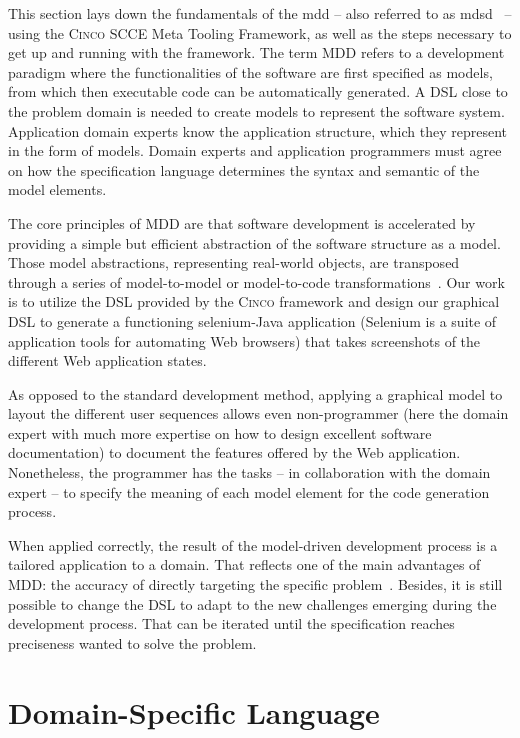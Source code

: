 This section lays down the fundamentals of the \gls{mdd} -- also referred to as \gls{mdsd}~\cite{fowler} --  using the \textsc{Cinco} SCCE Meta Tooling Framework, as well as the steps necessary to get up and running with the framework. The term MDD refers to a development paradigm where the functionalities of the software are first specified as models, from which then executable code can be automatically generated. A DSL close to the problem domain is needed to create models to represent the software system. Application domain experts know the application structure, which they represent in the form of models. Domain experts and application programmers must agree on how the specification language determines the syntax and semantic of the model elements.

The core principles of MDD are that software development is accelerated by providing a simple but efficient abstraction of the software structure as a model. Those model abstractions, representing real-world objects, are transposed through a series of model-to-model or model-to-code transformations~\cite{stahl_et_al}. Our work is to utilize the DSL provided by the \textsc{Cinco} framework and design our graphical DSL to generate a functioning \gls*{selenium}-Java application (Selenium is a suite of application tools for automating Web browsers) that takes screenshots of the different Web application states.

As opposed to the standard development method, applying a graphical model to layout the different user sequences allows even non-programmer (here the domain expert with much more expertise on how to design excellent software documentation) to document the features offered by the Web application. Nonetheless, the programmer has the tasks -- in collaboration with the domain expert -- to specify the meaning of each model element for the code generation process. 

When applied correctly, the result of the model-driven development process is a tailored application to a domain. That reflects one of the main advantages of MDD: the accuracy of directly targeting the specific problem~\cite{brambilla2017model}. Besides, it is still possible to change the DSL to adapt to the new challenges emerging during the development process. That can be iterated until the specification reaches preciseness wanted to solve the problem.

\section{Domain-Specific Language}\label{sec:DSL}

